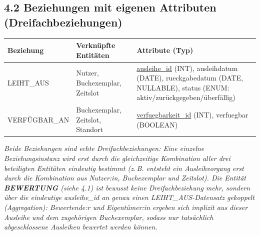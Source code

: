 \documentclass[11pt,a4paper]{article}
\begin{document}
\subsection*{4.2 Beziehungen mit eigenen Attributen (Dreifachbeziehungen)}
{\fontsize{9}{10}\selectfont
\begin{longtable}{@{}p{2.9cm}p{3.4cm}p{7.2cm}@{}}
\toprule
\textbf{Beziehung} & \textbf{Verknüpfte Entitäten} & \textbf{Attribute (Typ)} \\
\midrule
\endhead
LEIHT\_AUS & Nutzer, Buchexemplar, Zeitslot & \underline{ausleihe\_id} (INT), ausleihdatum (DATE), rueckgabedatum (DATE, NULLABLE), status (ENUM: aktiv/zurückgegeben/überfällig) \\
VERFÜGBAR\_AN & Buchexemplar, Zeitslot, Standort & \underline{verfuegbarkeit\_id} (INT), verfuegbar (BOOLEAN) \\
\bottomrule
\end{longtable}
}

\vspace{2pt}
\textit{Beide Beziehungen sind echte Dreifachbeziehungen: Eine einzelne Beziehungsinstanz wird erst durch die gleichzeitige Kombination aller drei beteiligten Entitäten eindeutig bestimmt (z.\,B. entsteht ein Ausleihvorgang erst durch die Kombination aus Nutzer:in, Buchexemplar \emph{und} Zeitslot). Die Entität \textbf{BEWERTUNG} (siehe 4.1) ist bewusst \emph{keine} Dreifachbeziehung mehr, sondern über die eindeutige \textit{ausleihe\_id} an genau einen LEIHT\_AUS-Datensatz gekoppelt (Aggregation): Bewertende:r und Eigentümer:in ergeben sich implizit aus dieser Ausleihe und dem zugehörigen Buchexemplar, sodass nur tatsächlich abgeschlossene Ausleihen bewertet werden können.}
\end{document}
